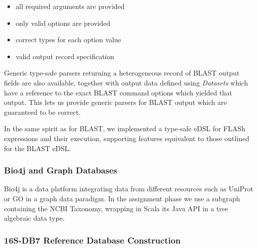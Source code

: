 \documentclass[fontsize=8pt,paper=a4,pagesize,abstracton]{scrartcl}
\providecommand{\tightlist}{%
\setlength{\itemsep}{0pt}\setlength{\parskip}{0pt}}
\begin{document}
\begin{itemize}
\tightlist
\item
  all required arguments are provided
\item
  only valid options are provided
\item
  correct types for each option value
\item
  valid output record specification
\end{itemize}

Generic type-safe parsers returning a heterogeneous record of BLAST
output fields are also available, together with output data defined
using \emph{Datasets} which have a reference to the exact BLAST command
options which yielded that output. This lets us provide generic parsers
for BLAST output which are guaranteed to be correct.

In the same spirit as for BLAST, we implemented a type-safe eDSL for
FLASh expressions and their execution, supporting features equivalent to
those outlined for the BLAST eDSL.

\subsubsection{Bio4j and Graph
Databases}\label{bio4j-and-graph-databases}

Bio4j \autocite{pareja2015bio4j} is a data platform integrating data
from different resources such as UniProt or GO in a graph data paradigm.
In the assignment phase we use a subgraph containing the NCBI Taxonomy,
wrapping in Scala its Java API in a tree algebraic data type.

\subsubsection{16S-DB7 Reference Database
Construction}\label{s-db7-reference-database-construction}
\end{document}
